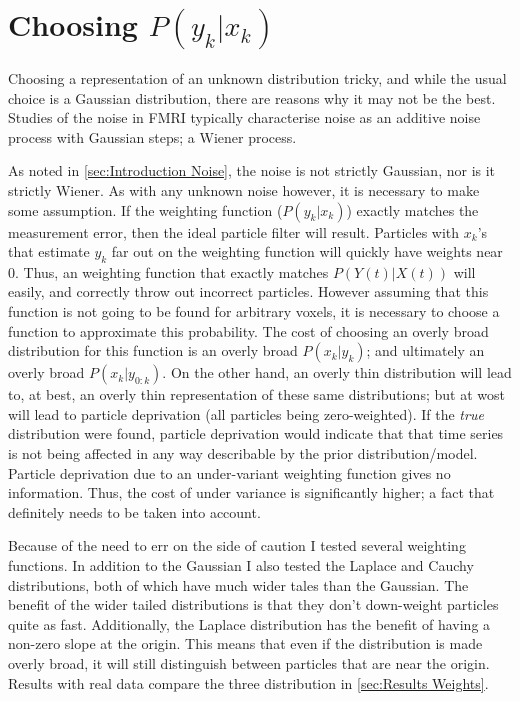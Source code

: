 \section{Choosing $P(y_k | x_k)$}
Choosing a representation of an unknown distribution tricky, and while
the usual choice is a Gaussian distribution, there are reasons why it
may not be the best.  Studies of the noise in FMRI typically characterise
noise as an additive noise process with Gaussian steps; a Wiener process. 

As noted in \autoref{sec:Introduction Noise}, the noise is not strictly Gaussian,
nor is it strictly Wiener. As with any unknown noise however, it is necessary 
to make some assumption. If the weighting function ($P(y_k | x_k)$) exactly
matches the measurement error, then the ideal particle filter will result.
Particles with $x_k$'s that estimate $y_k$ far out on the weighting
function will quickly have weights near 0. Thus, an weighting function that
exactly matches $P(Y(t) | X(t))$ will easily, and correctly throw out incorrect
particles. However assuming that this function is not going to be found 
for arbitrary voxels, it is necessary to choose a function to approximate this 
probability. The cost of choosing an overly broad distribution for this
function is an overly broad $P(x_k | y_k)$; and ultimately an overly
broad $P(x_k | y_{0:k})$. On the other hand, an overly thin distribution
will lead to, at best, an overly thin representation of these same 
distributions; but at wost will lead to particle deprivation (all particles
being zero-weighted). If the \emph{true} distribution were found, particle
deprivation would indicate that that time series is not being affected
in any way describable by the prior distribution/model. Particle deprivation
due to an under-variant weighting function gives no information. Thus,
the cost of under variance is significantly higher; a fact that definitely needs
to be taken into account. 

Because of the need to err on the side of caution I tested several weighting
functions. In addition to the Gaussian I also tested the Laplace and Cauchy
distributions, both of which have much wider tales than the Gaussian. The
benefit of the wider tailed distributions is that they don't down-weight
particles quite as fast. Additionally, the Laplace distribution has the
benefit of having a non-zero slope at the origin. This means that even
if the distribution is made overly broad, it will still distinguish between
particles that are near the origin. Results with real data compare 
the three distribution in \autoref{sec:Results Weights}.

